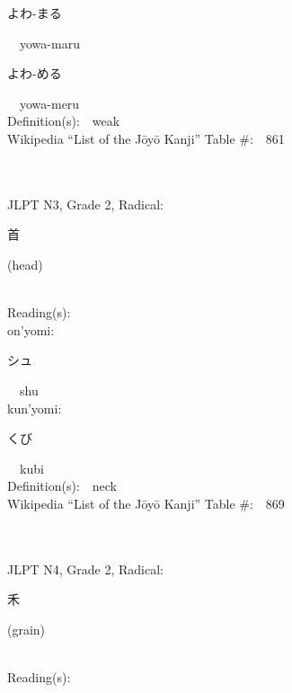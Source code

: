 \begin{multicols}{2}
{\hspace*{2em}}{\begin{CJK}{UTF8}{min} よわ-まる \end{CJK}}\ \ yowa-maru\ \ \\
{\hspace*{2em}}{\begin{CJK}{UTF8}{min} よわ-める \end{CJK}}\ \ yowa-meru\ \ \\
Definition(s):\ \ weak \\
Wikipedia ``List of the J\=oy\=o Kanji'' Table \#:\ \ 861 \\
\ \ \\
{\fontsize{34pt}{40pt}  }\ \ \\  %
{JLPT N3, Grade 2, Radical:\ \ {\begin{CJK}{UTF8}{min} 首 \end{CJK}} (head) } \\
Reading(s):\ \ \\
{\hspace*{1em}}on'yomi:\ \ \\
{\hspace*{2em}}{\begin{CJK}{UTF8}{min} シュ \end{CJK}}\ \ shu\ \ \\
{\hspace*{1em}}kun'yomi:\ \ \\
{\hspace*{2em}}{\begin{CJK}{UTF8}{min} くび \end{CJK}}\ \ kubi\ \ \\
Definition(s):\ \ neck \\
Wikipedia ``List of the J\=oy\=o Kanji'' Table \#:\ \ 869 \\
\ \ \\
{\fontsize{34pt}{40pt}  }\ \ \\  %
{JLPT N4, Grade 2, Radical:\ \ {\begin{CJK}{UTF8}{min} 禾 \end{CJK}} (grain) } \\
Reading(s):\ \ \\

\end{multicols}
